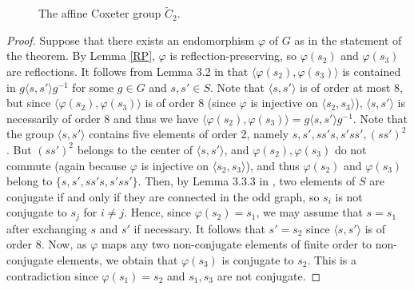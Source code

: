 \documentclass[a4paper, 11pt]{amsart}
\theoremstyle{definition}
\theoremstyle{remark}
\newcommand{\gianluca}[1]{{\textcolor{blue}{Gianluca: #1}} }
\begin{document}

\begin{figure}[h!]
  \centering
  \caption{The affine Coxeter group $\tilde{C}_2$.}
  \label{C3}
\end{figure}

\begin{proof}
Suppose that there exists an endomorphism $\varphi$ of $G$ as in the statement of the theorem. By Lemma \ref{RP}, $\varphi$ is reflection-preserving, so $\varphi(s_2)$ and $\varphi(s_3)$ are reflections. It follows from Lemma 3.2 in \cite{CM13} that $\langle \varphi(s_2), \varphi(s_3)\rangle$ is contained in $g\langle s,s'\rangle g^{-1}$ for some $g\in G$ and $s,s'\in S$. Note that $\langle s,s'\rangle$ is of order at most 8, but since $\langle \varphi(s_2), \varphi(s_3)\rangle$ is of order 8 (since $\varphi$ is injective on $\langle s_2,s_3\rangle$), $\langle s,s'\rangle$ is necessarily of order 8 and thus we have $\langle \varphi(s_2), \varphi(s_3)\rangle=g\langle s,s'\rangle g^{-1}$. Note that the group $\langle s,s'\rangle$ contains five elements of order 2, namely $s,s',ss's,s'ss', (ss')^2$.  But $(ss')^2$ belongs to the center of $\langle s,s'\rangle$, and $\varphi(s_2),\varphi(s_3)$ do not commute (again because $\varphi$ is injective on $\langle s_2,s_3\rangle$), and thus $\varphi(s_2)$ and $\varphi(s_3)$ belong to $\lbrace s,s',ss's,s'ss'\rbrace$. Then, by Lemma 3.3.3 in \cite{davis}, two elements of $S$ are conjugate if and only if they are connected in the odd graph, so $s_i$ is not conjugate to $s_j$ for $i\neq j$. Hence, since $\varphi(s_2)=s_1$, we may assume that $s=s_1$ after exchanging $s$ and $s'$ if necessary. It follows that $s'=s_2$ since $\langle s,s'\rangle$ is of order 8. Now, as $\varphi$ maps any two non-conjugate elements of finite order to non-conjugate elements, we obtain that $\varphi(s_3)$ is conjugate to $s_2$. This is a contradiction since $\varphi(s_1)=s_2$ and $s_1,s_3$ are not conjugate.\end{proof}
\end{document}
